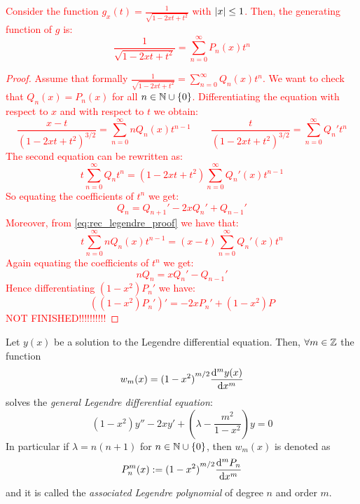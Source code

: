 \documentclass[../main.tex]{subfiles}
\begin{document}
\textcolor{red}{\begin{proposition}
    Consider the function $g_x(t)=\frac{1}{\sqrt{1-2xt+t^2}}$ with $\abs{x}\leq 1$. Then, the generating function of $g$ is:
    \begin{equation}
      \frac{1}{\sqrt{1-2xt+t^2}}=\sum_{n=0}^{\infty}P_n(x)t^n
    \end{equation}
  \end{proposition}
  \begin{proof}
    Assume that formally $\frac{1}{\sqrt{1-2xt+t^2}}=\sum_{n=0}^{\infty}Q_n(x)t^n$. We want to check that $Q_n(x)=P_n(x)$ for all $n\in\mathbb{N}\cup\{0\}$. Differentiating the equation with respect to $x$ and with respect to $t$ we obtain:
    \begin{equation}\label{eq:rec_legendre_proof}
      \frac{x-t}{{(1-2xt+t^2)}^{3/2}}=\sum_{n=0}^{\infty}nQ_n(x)t^{n-1}\qquad\frac{t}{{(1-2xt+t^2)}^{3/2}}=\sum_{n=0}^{\infty}{Q_n}'t^n
    \end{equation}
    The second equation can be rewritten as:
    \begin{equation}
      t\sum_{n=0}^{\infty}Q_n t^n=(1-2xt+t^2)\sum_{n=0}^{\infty}{Q_n}'(x)t^{n-1}
    \end{equation}
    So equating the coefficients of $t^n$ we get:
    \begin{equation}
      Q_{n}={Q_{n+1}}'-2x{Q_n}'+{Q_{n-1}}'
    \end{equation}
    Moreover, from \cref{eq:rec_legendre_proof} we have that:
    \begin{equation}
      t\sum_{n=0}^{\infty}nQ_n(x)t^{n-1}=(x-t)\sum_{n=0}^{\infty}{Q_n}'(x)t^{n}
    \end{equation}
    Again equating the coefficients of $t^n$ we get:
    \begin{equation}
      nQ_n=x{Q_n}'-{Q_{n-1}}'
    \end{equation}
    Hence differentiating $(1-x^2){P_n}'$ we have:
    \begin{equation}
      {((1-x^2){P_n}')}'=-2x{P_n}'+(1-x^2)P
    \end{equation}
    \textcolor{red}{NOT FINISHED!!!!!!!!!!}
  \end{proof}}
\begin{proposition}\label{prop:associate_legendre}
  Let $y(x)$ be a solution to the Legendre differential equation. Then, $\forall m\in\mathbb{Z}$ the function
  \begin{equation}
    w_m(x)={(1-x^2)}^{m/2} \dv[m]{y(x)}{x}
  \end{equation}
  solves the \emph{general Legendre differential equation}:
  \begin{equation}
    (1-x^2)y''-2xy'+\left(\lambda - \frac{m^2}{1-x^2}\right) y=0
  \end{equation}
  In particular if $\lambda=n(n+1)$ for $n\in\mathbb{N}\cup\{0\}$, then $w_m(x)$ is denoted as
  \begin{equation}
    P_n^m(x):={(1-x^2)}^{m/2} \dv[m]{P_n}{x}
  \end{equation}
  and it is called the \emph{associated Legendre polynomial} of degree $n$ and order $m$.
\end{proposition}
\end{document}
